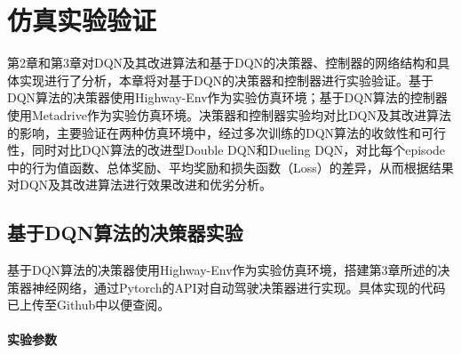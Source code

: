 %
%
%
%
%

\chapter{仿真实验验证}

第2章和第3章对DQN及其改进算法和基于DQN的决策器、控制器的网络结构和具体实现进行了分析，本章将对基于DQN的决策器和控制器进行实验验证。基于DQN算法的决策器使用Highway-Env作为实验仿真环境；基于DQN算法的控制器使用Metadrive作为实验仿真环境。决策器和控制器实验均对比DQN及其改进算法的影响，主要验证在两种仿真环境中，经过多次训练的DQN算法的收敛性和可行性，同时对比DQN算法的改进型Double DQN和Dueling DQN，对比每个episode中的行为值函数、总体奖励、平均奖励和损失函数（Loss）的差异，从而根据结果对DQN及其改进算法进行效果改进和优劣分析。

\section{基于DQN算法的决策器实验}\label{4.1基于DQN算法的决策器实验}

基于DQN算法的决策器使用Highway-Env作为实验仿真环境，搭建第3章所述的决策器神经网络，通过Pytorch的API对自动驾驶决策器进行实现。具体实现的代码已上传至Github中以便查阅\cite{highway-env-dqn}。

\subsubsection{实验参数}

\begin{table}[htbp]
    \caption{决策器网络参数}\label{决策器网络参数}
    \centering
    \renewcommand\arraystretch{1.5}
\end{table}

